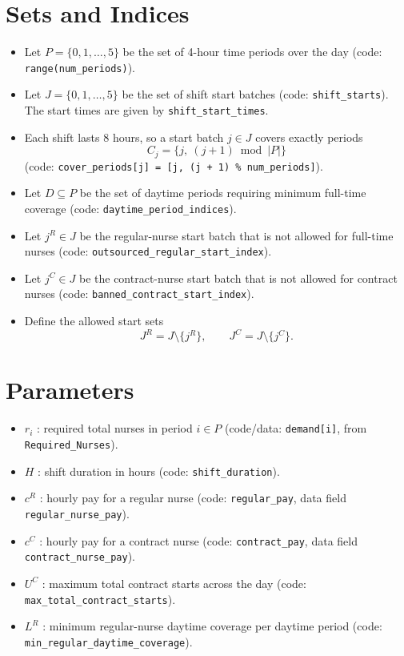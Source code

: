 \section*{Sets and Indices}

\begin{itemize}
    \item Let $P=\{0,1,\dots,5\}$ be the set of 4-hour time periods over the day (code: \texttt{range(num\_periods)}).
    \item Let $J=\{0,1,\dots,5\}$ be the set of shift start batches (code: \texttt{shift\_starts}). The start times are given by \texttt{shift\_start\_times}.
    \item Each shift lasts 8 hours, so a start batch $j\in J$ covers exactly periods
    \[
    C_j=\{j,\ (j+1)\bmod |P|\}
    \]
    (code: \texttt{cover\_periods[j] = [j, (j + 1) \% num\_periods]}).
    \item Let $D \subseteq P$ be the set of daytime periods requiring minimum full-time coverage (code: \texttt{daytime\_period\_indices}).
    \item Let $j^{R}\in J$ be the regular-nurse start batch that is not allowed for full-time nurses (code: \texttt{outsourced\_regular\_start\_index}).
    \item Let $j^{C}\in J$ be the contract-nurse start batch that is not allowed for contract nurses (code: \texttt{banned\_contract\_start\_index}).
    \item Define the allowed start sets
    \[
    J^R = J \setminus \{j^R\}, \qquad J^C = J \setminus \{j^C\}.
    \]
\end{itemize}

\section*{Parameters}

\begin{itemize}
    \item $r_i$ : required total nurses in period $i\in P$ (code/data: \texttt{demand[i]}, from \texttt{Required\_Nurses}).
    \item $H$ : shift duration in hours (code: \texttt{shift\_duration}).
    \item $c^R$ : hourly pay for a regular nurse (code: \texttt{regular\_pay}, data field \texttt{regular\_nurse\_pay}).
    \item $c^C$ : hourly pay for a contract nurse (code: \texttt{contract\_pay}, data field \texttt{contract\_nurse\_pay}).
    \item $U^C$ : maximum total contract starts across the day (code: \texttt{max\_total\_contract\_starts}).
    \item $L^R$ : minimum regular-nurse daytime coverage per daytime period (code: \texttt{min\_regular\_daytime\_coverage}).
\end{itemize}

